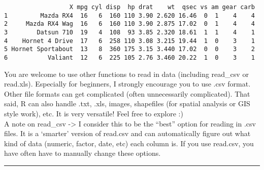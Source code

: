 \documentclass[
  letterpaper,
  DIV=11,
  numbers=noendperiod]{scrartcl}
\begin{document}
\begin{verbatim}
                  X mpg cyl disp  hp drat    wt  qsec vs am gear carb
1         Mazda RX4  16   6  160 110 3.90 2.620 16.46  0  1    4    4
2     Mazda RX4 Wag  16   6  160 110 3.90 2.875 17.02  0  1    4    4
3        Datsun 710  19   4  108  93 3.85 2.320 18.61  1  1    4    1
4    Hornet 4 Drive  17   6  258 110 3.08 3.215 19.44  1  0    3    1
5 Hornet Sportabout  13   8  360 175 3.15 3.440 17.02  0  0    3    2
6           Valiant  12   6  225 105 2.76 3.460 20.22  1  0    3    1
\end{verbatim}

You are welcome to use other functions to read in data (including
read\_csv or read.xls). Especially for beginners, I strongly encourage
you to use .csv format. Other file formats can get complicated (often
unnecessarily complicated). That said, R can also handle .txt, .xls,
images, shapefiles (for spatial analysis or GIS style work), etc. It is
very versatile! Feel free to explore :)\\
A note on read\_csv -\textgreater{} I consider this to be the ``best''
option for reading in .csv files. It is a `smarter' version of read.csv
and can automatically figure out what kind of data (numeric, factor,
date, etc) each column is. If you use read.csv, you have often have to
manually change these options.

\begin{center}\rule{0.5\linewidth}{0.5pt}\end{center}
\end{document}
